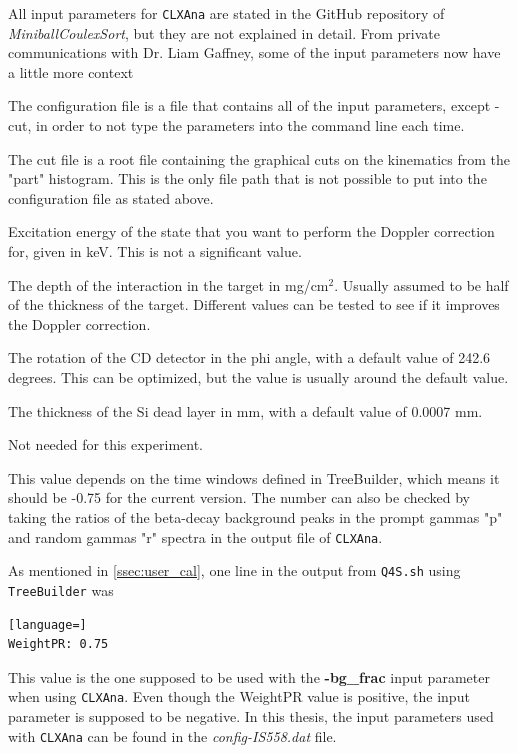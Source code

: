 \documentclass[twoside,english]{uiofysmaster/uiofysmaster}
\let\orgautoref\autoref
\renewcommand{\autoref}
        {%
		 \def\subsectionautorefname{Section}%
		 \def\subsubsectionautorefname{Section}%
          \orgautoref}
\begin{document}
All input parameters for \texttt{CLXAna} are stated in the GitHub repository of \textsl{MiniballCoulexSort}, but they are not explained in detail. 
From private communications with Dr. Liam Gaffney, some of the input parameters now have a little more context
\begin{description}[align=left]
	\item [-c] The configuration file is a file that contains all of the input parameters, except -cut, in order to not type the parameters into the command line each time.
	\item [-cut] The cut file  is a root file containing the graphical cuts on the kinematics from the "part" histogram. This is the only file path that is not possible to put into the configuration file as stated above.
	\item [-Ex] Excitation energy of the state that you want to perform the Doppler correction for, given in keV. This is not a significant value.
	\item [-depth] The depth of the interaction in the target in mg/cm$^2$. Usually assumed to be half of the thickness of the target. Different values can be tested to see if it improves the Doppler correction.
	\item [-cdoffset] The rotation of the CD detector in the phi angle, with a default value of 242.6 degrees. This can be optimized, but the value is usually around the default value.
	\item [-deadlayer] The thickness of the Si dead layer in mm, with a default value of 0.0007 mm.
	\item [-spededist] Not needed for this experiment.
	\item [-bg\_frac] This value depends on the time windows defined in TreeBuilder, which means it should be -0.75 for the current version. The number can also be checked by taking the ratios of the beta-decay background peaks in the prompt gammas "p" and random gammas "r" spectra in the output file of \texttt{CLXAna}.
\end{description}
As mentioned in \autoref{ssec:user_cal}, one line in the output from \texttt{Q4S.sh} using \texttt{TreeBuilder} was
\begin{lstlisting}[language=]
WeightPR: 0.75
\end{lstlisting}
This value is the one supposed to be used with the \textbf{-bg\_frac} input parameter when using \texttt{CLXAna}.
Even though the WeightPR value is positive, the input parameter is supposed to be negative.  
In this thesis, the input parameters used with \texttt{CLXAna} can be found in the \textit{config-IS558.dat} file.
\end{document}
